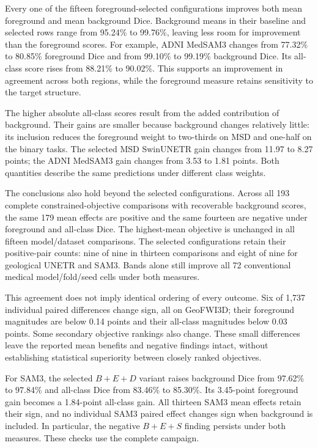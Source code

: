 \documentclass[12pt,a4paper]{article}
\begin{document}
Every one of the fifteen foreground-selected configurations improves both
mean foreground and mean background Dice. Background means in their
baseline and selected rows range from 95.24\% to 99.76\%, leaving
less room for improvement than the foreground scores. For example,
ADNI MedSAM3 changes from 77.32\% to 80.85\% foreground Dice and
from 99.10\% to 99.19\% background Dice. Its all-class score rises
from 88.21\% to 90.02\%. This supports an improvement in agreement
across both regions, while the foreground measure retains sensitivity
to the target structure.

The higher absolute all-class scores result from the added contribution
of background. Their gains are smaller because background changes
relatively little: its inclusion reduces the foreground weight to
two-thirds on MSD and one-half on the binary tasks. The selected
MSD SwinUNETR gain changes from 11.97 to 8.27 points; the ADNI
MedSAM3 gain changes from 3.53 to 1.81 points. Both quantities describe
the same predictions under different class weights.

The conclusions also hold beyond the selected configurations. Across
all 193 complete constrained-objective comparisons with recoverable
background scores, the same 179 mean effects are positive and the
same fourteen are negative under foreground and all-class Dice.
The highest-mean objective is unchanged in all fifteen model/dataset
comparisons. The selected configurations retain their positive-pair
counts: nine of nine in thirteen comparisons and eight of nine for
geological UNETR and SAM3. Bands alone still improve all 72 conventional medical
model/fold/seed cells under both measures.

This agreement does not imply identical ordering of every outcome.
Six of 1,737 individual paired differences change sign, all on
GeoFWI3D; their foreground magnitudes are below 0.14 points and
their all-class magnitudes below 0.03 points. Some secondary objective
rankings also change. These small differences leave the reported
mean benefits and negative findings intact, without establishing
statistical superiority between closely ranked objectives.

For SAM3, the selected $B+E+D$ variant raises background Dice
from 97.62\% to 97.84\% and all-class Dice from 83.46\% to
85.30\%. Its 3.45-point foreground gain becomes a 1.84-point
all-class gain. All thirteen SAM3 mean effects retain their sign,
and no individual SAM3 paired effect changes sign when background
is included. In particular, the negative $B+E+S$ finding persists
under both measures. These checks use the complete campaign.
\end{document}
